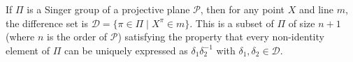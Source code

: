 If $\Pi$ is a Singer group of a projective plane $\mathcal{P}$, then for any point $X$ and line $m$, the difference set is $\mathcal{D} = \{\pi \in \Pi \mid X^\pi \in m\}$. This is a subset of $\Pi$ of size $n+1$ (where $n$ is the order of $\mathcal{P}$) satisfying the property that every non-identity element of $\Pi$ can be uniquely expressed as $\delta_1 \delta_2^{-1}$ with $\delta_1, \delta_2 \in \mathcal{D}$.
